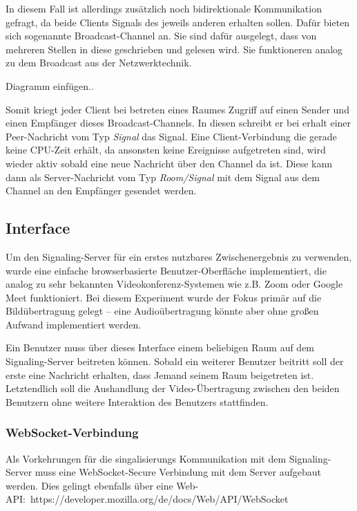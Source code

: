\documentclass[journal]{IEEEtran}
\begin{document}
\begin{twocolumn}
In diesem Fall ist allerdings zusätzlich noch bidirektionale Kommunikation
gefragt, da beide Clients Signals des jeweils anderen erhalten sollen. Dafür
bieten sich sogenannte Broadcast-Channel an. Sie sind dafür ausgelegt, dass von
mehreren Stellen in diese geschrieben und gelesen wird. Sie funktioneren analog
zu dem Broadcast aus der Netzwerktechnik.

Diagramm einfügen..





Somit kriegt jeder Client bei betreten eines Raumes Zugriff auf einen Sender
und einen Empfänger dieses Broadcast-Channels. In diesen schreibt er bei erhalt
einer Peer-Nachricht vom Typ \textit{Signal} das Signal. Eine Client-Verbindung
die gerade keine CPU-Zeit erhält, da ansonsten keine Ereignisse aufgetreten
sind, wird wieder aktiv sobald eine neue Nachricht über den Channel da ist.
Diese kann dann als Server-Nachricht vom Typ \textit{Room/Signal} mit dem
Signal aus dem Channel an den Empfänger gesendet werden.

\subsection{Interface}

Um den Signaling-Server für ein erstes nutzbares Zwischenergebnis zu verwenden,
wurde eine einfache browserbasierte Benutzer-Oberfläche implementiert, die
analog zu sehr bekannten Videokonferenz-Systemen wie z.B. Zoom oder Google Meet
funktioniert. Bei diesem Experiment wurde der Fokus primär auf die
Bildübertragung gelegt – eine Audioübertragung könnte aber ohne großen Aufwand
implementiert werden.

Ein Benutzer muss über dieses Interface einem beliebigen Raum auf dem
Signaling-Server beitreten können. Sobald ein weiterer Benutzer beitritt soll
der erste eine Nachricht erhalten, dass Jemand seinem Raum beigetreten ist.
Letztendlich soll die Aushandlung der Video-Übertragung zwischen den beiden
Benutzern ohne weitere Interaktion des Benutzers stattfinden.

\subsubsection{WebSocket-Verbindung}

Als Vorkehrungen für die singalisierungs Kommunikation mit dem Signaling-Server
muss eine WebSocket-Secure Verbindung mit dem Server aufgebaut werden. Dies
gelingt ebenfalls über eine Web-API:\
https://developer.mozilla.org/de/docs/Web/API/WebSocket


\end{twocolumn}
\end{document}
